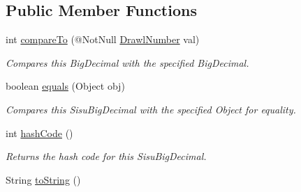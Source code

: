\subsection*{Public Member Functions}
\begin{DoxyCompactItemize}
\item 
int \hyperlink{classcom_1_1aarrelaakso_1_1drawl_1_1_drawl_number_a6bab13fc3993e590f3b4f0198b0c8ee4}{compare\+To} (@Not\+Null \hyperlink{classcom_1_1aarrelaakso_1_1drawl_1_1_drawl_number}{Drawl\+Number} val)
\begin{DoxyCompactList}\small\item\em Compares this Big\+Decimal with the specified Big\+Decimal. \end{DoxyCompactList}\item 
boolean \hyperlink{classcom_1_1aarrelaakso_1_1drawl_1_1_drawl_number_a1599c6bdf131bc6b8a985f6a4b1b6f00}{equals} (Object obj)
\begin{DoxyCompactList}\small\item\em Compares this Sisu\+Big\+Decimal with the specified Object for equality. \end{DoxyCompactList}\item 
int \hyperlink{classcom_1_1aarrelaakso_1_1drawl_1_1_drawl_number_a0048361007923e4b902a4581eb9ba45c}{hash\+Code} ()
\begin{DoxyCompactList}\small\item\em Returns the hash code for this Sisu\+Big\+Decimal. \end{DoxyCompactList}\item 
String \hyperlink{classcom_1_1aarrelaakso_1_1drawl_1_1_drawl_number_a24775bf5217d477c4b39149596210184}{to\+String} ()
\end{DoxyCompactItemize}
